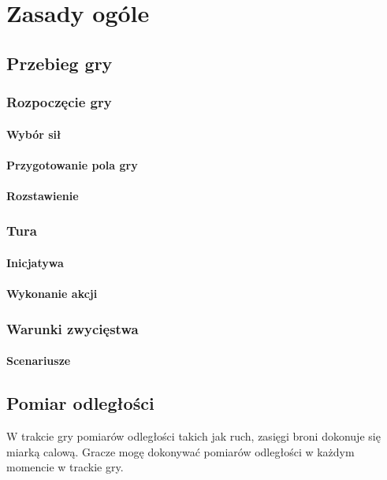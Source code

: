 \chapter{Zasady ogóle}

\section{Przebieg gry}

\subsection{Rozpoczęcie gry}

\subsubsection{Wybór sił}

\subsubsection{Przygotowanie pola gry}

\subsubsection{Rozstawienie}

\subsection{Tura}

\subsubsection{Inicjatywa}

\subsubsection{Wykonanie akcji}

\subsection{Warunki zwycięstwa}

\subsubsection{Scenariusze}



\section{Pomiar odległości}
W trakcie gry pomiarów odległości takich jak ruch, zasięgi broni dokonuje się miarką calową. Gracze mogę dokonywać pomiarów odległości w każdym momencie w trackie gry. 

